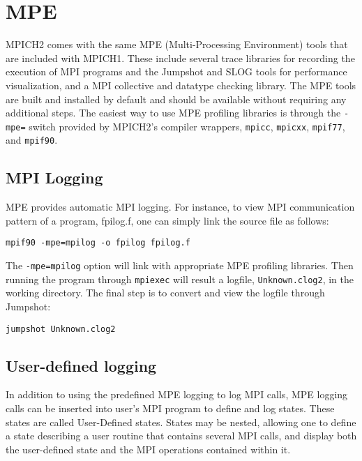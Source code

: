\documentclass[dvipdfm,11pt]{article}
\begin{document}
\section{MPE}
\label{sec:mpe}
MPICH2 comes with the same MPE (Multi-Processing Environment) tools that are
included with MPICH1.  These include several trace libraries for recording the
execution of MPI programs and the Jumpshot and SLOG tools for performance
visualization, and a MPI collective and datatype checking library.
The MPE tools are built and installed by default and should be available
without requiring any additional steps.  The easiest way to use MPE profiling
libraries is through the \texttt{-mpe=} switch provided by MPICH2's
compiler wrappers,
\texttt{mpicc}, \texttt{mpicxx}, \texttt{mpif77}, and \texttt{mpif90}.

\subsection{MPI Logging}
\label{sec:mpe_mpilog}
MPE provides automatic MPI logging.
For instance, to view MPI communication pattern of a program, fpilog.f,
one can simply link the source file as follows:
\begin{verbatim}
mpif90 -mpe=mpilog -o fpilog fpilog.f
\end{verbatim}
The \texttt{-mpe=mpilog} option will link with appropriate MPE profiling
libraries.  Then running the program through \texttt{mpiexec}
will result a logfile, \texttt{Unknown.clog2}, in the working directory.
The final step is to convert and view the logfile through Jumpshot:
\begin{verbatim}
jumpshot Unknown.clog2
\end{verbatim}

\subsection{User-defined logging}
\label{sec:mpe_userlog}
In addition to using the predefined MPE logging to log MPI calls,
MPE logging calls can be inserted into user's MPI program to define
and log states.  These states are called User-Defined states.  States may
be nested, allowing one to define a state describing a user routine that
contains several MPI calls, and display both the user-defined state and
the MPI operations contained within it.
\end{document}
